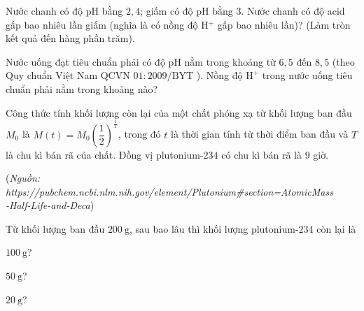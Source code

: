 \begin{bt}%
	Nước chanh có độ pH bằng $2{,}4$; giấm có độ pH bằng $3$. Nước chanh có độ acid gấp bao nhiêu lần giấm (nghĩa là có nồng độ H$^{+}$ gấp bao nhiêu lần)? (Làm tròn kết quả đến hàng phần trăm).
\end{bt}

\begin{bt}%
	Nước uống đạt tiêu chuẩn phải có độ $\mathrm{pH}$ nằm trong khoảng từ $6{,}5$ đến $8{,}5$ (theo Quy chuẩn Việt Nam QCVN $01: 2009 / \mathrm{BYT}$ ). Nồng độ $\mathrm{H}^{+}$ trong nước uống tiêu chuẩn phải nằm trong khoảng nào?
\end{bt}

\begin{bt}%
	Công thức tính khối lượng còn lại của một chất phóng xạ từ khối lượng ban đầu $M_0$ là $M(t)=M_0\left(\dfrac{1}{2}\right)^{\tfrac{1}{T}}$, trong đó $t$ là thời gian tính từ thời điểm ban đầu và $T$ là chu kì bán rã của chất. Đồng vị plutonium-$234$ có chu kì bán rã là $9$ giờ.
	\begin{flushright}
		(\textit{Nguồn: https://pubchem.ncbi.nlm.nih.gov/element/Plutonium\#section=AtomicMass\\-Half-Life-and-Deca})
	\end{flushright}
	Từ khối lượng ban đầu $200 \mathrm{~g}$, sau bao lâu thì khối lượng plutonium-$234$ còn lại là
	\begin{listEX}[3]
		\item $100 \mathrm{~g}$?
		\item $50 \mathrm{~g}$?
		\item $20 \mathrm{~g}$?
	\end{listEX}
\end{bt}

